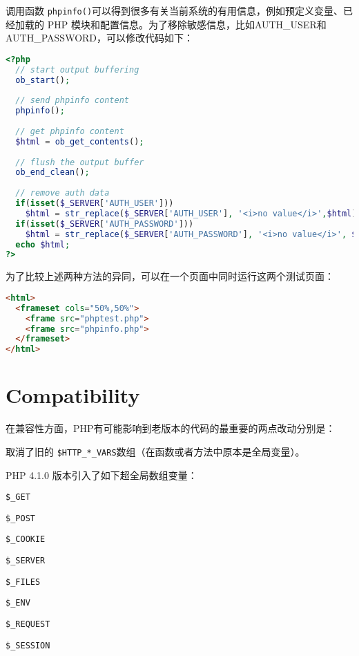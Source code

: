 调用函数 \texttt{phpinfo()}可以得到很多有关当前系统的有用信息，例如预定义变量、已经加载的 PHP 模块和配置信息。为了移除敏感信息，比如AUTH\_USER和AUTH\_PASSWORD，可以修改代码如下：

\begin{lstlisting}[language=PHP]
<?php
  // start output buffering
  ob_start();
  
  // send phpinfo content
  phpinfo();
  
  // get phpinfo content
  $html = ob_get_contents();
  
  // flush the output buffer
  ob_end_clean();
  
  // remove auth data
  if(isset($_SERVER['AUTH_USER']))
    $html = str_replace($_SERVER['AUTH_USER'], '<i>no value</i>',$html);
  if(isset($_SERVER['AUTH_PASSWORD']))
    $html = str_replace($_SERVER['AUTH_PASSWORD'], '<i>no value</i>', $html);
  echo $html;
?>
\end{lstlisting}

为了比较上述两种方法的异同，可以在一个页面中同时运行这两个测试页面：

\begin{lstlisting}[language=HTML]
<html>
  <frameset cols="50%,50%">
    <frame src="phptest.php">
    <frame src="phpinfo.php">
  </frameset>
</html>
\end{lstlisting}



















\chapter{Compatibility}


在兼容性方面，PHP有可能影响到老版本的代码的最重要的两点改动分别是：

\begin{compactitem}
\item 取消了旧的 \texttt{\$HTTP\_*\_VARS}数组（在函数或者方法中原本是全局变量）。

\end{compactitem}

PHP 4.1.0 版本引入了如下超全局数组变量：

\begin{compactitem}
\item \texttt{\$\_GET}
\item \texttt{\$\_POST}
\item \texttt{\$\_COOKIE}
\item \texttt{\$\_SERVER}
\item \texttt{\$\_FILES}
\item \texttt{\$\_ENV}
\item \texttt{\$\_REQUEST}
\item \texttt{\$\_SESSION}
\end{compactitem}

